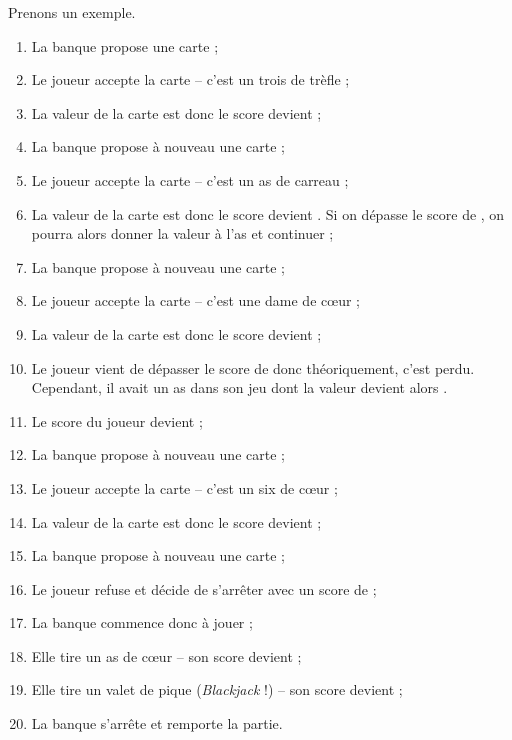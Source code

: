 \documentclass[a4paper]{article}
\begin{document}
		Prenons un exemple.
		\begin{enumerate}
			\item La banque propose une carte ;
			\item Le joueur accepte la carte -- c'est un trois de trèfle ;
			\item La valeur de la carte est  donc le score devient  ;
			\item La banque propose à nouveau une carte ;
			\item Le joueur accepte la carte -- c'est un as de carreau ;
			\item La valeur de la carte est  donc le score devient .
			Si on dépasse le score de , on pourra alors donner la valeur  à l'as et continuer ;
			\item La banque propose à nouveau une carte ;
			\item Le joueur accepte la carte -- c'est une dame de cœur ;
			\item La valeur de la carte est  donc le score devient  ;
			\item Le joueur vient de dépasser le score de  donc théoriquement, c'est perdu.
			Cependant, il avait un as dans son jeu dont la valeur devient alors .
			\item Le score du joueur devient  ;
			\item La banque propose à nouveau une carte ;
			\item Le joueur accepte la carte -- c'est un six de cœur ;
			\item La valeur de la carte est  donc le score devient  ;
			\item La banque propose à nouveau une carte ;
			\item Le joueur refuse et décide de s'arrêter avec un score de  ;
			\item La banque commence donc à jouer ;
			\item Elle tire un as de cœur -- son score devient  ;
			\item Elle tire un valet de pique (\emph{Blackjack} !) -- son score devient  ;
			\item La banque s'arrête et remporte la partie.
		\end{enumerate}
\end{document}
